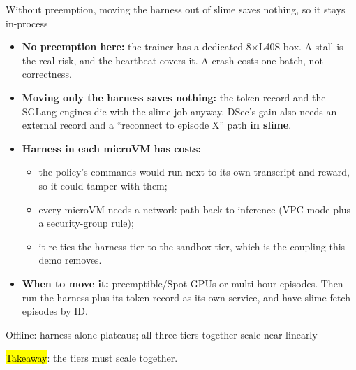 \begin{frame}{Without preemption, moving the harness out of slime saves nothing, so it stays in-process}
\begin{itemize}\footnotesize\setlength{\itemsep}{1.2mm}
\item \textbf{No preemption here:} the trainer has a dedicated 8$\times$L40S box. A stall is the real risk, and the heartbeat covers it. A crash costs one batch, not correctness.
\item \textbf{Moving only the harness saves nothing:} the token record and the SGLang engines die with the slime job anyway. DSec's gain also needs an external record and a ``reconnect to episode X'' path \textbf{in slime}.
\item \textbf{Harness in each microVM has costs:}
\begin{itemize}
\item the policy's commands would run next to its own transcript and reward, so it could tamper with them;
\item every microVM needs a network path back to inference (VPC mode plus a security-group rule);
\item it re-ties the harness tier to the sandbox tier, which is the coupling this demo removes.
\end{itemize}
\item \textbf{When to move it:} preemptible/Spot GPUs or multi-hour episodes. Then run the harness plus its token record as its own service, and have slime fetch episodes by ID.
\end{itemize}
\end{frame}


\begin{frame}{Offline: harness alone plateaus; all three tiers together scale near-linearly}
\centering
{}\par
\vspace{2mm}
\raggedright
{\small\hl{Takeaway}: the tiers must scale together.\par}
\end{frame}

